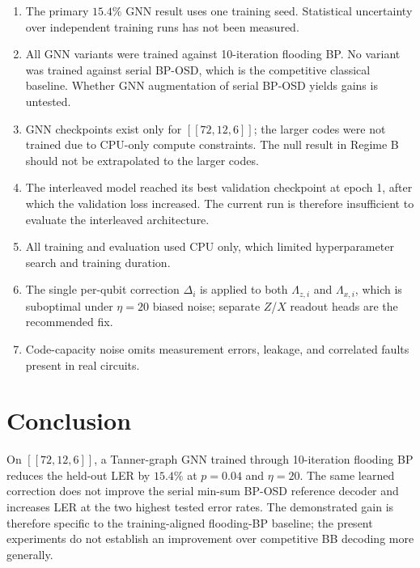 \documentclass[a4paper,twocolumn,11pt,nopdfoutputerror]{quantumarticle}
\newcommand{\llr}{\Lambda}
\newcommand{\code}[3]{\ensuremath{[\![#1,#2,#3]\!]}}
\begin{document}
\begin{enumerate}[leftmargin=*,topsep=3pt,itemsep=2pt,
                  label=(\roman*)]
\item The primary $15.4\%$ GNN result uses one training seed. Statistical
      uncertainty over independent training runs has not been measured.
\item All GNN variants were trained against 10-iteration
      flooding BP. No variant was trained against serial BP-OSD,
      which is the competitive classical baseline. Whether GNN
      augmentation of serial BP-OSD yields gains is untested.
\item GNN checkpoints exist only for $\code{72}{12}{6}$; the
      larger codes were not trained due to CPU-only compute
      constraints. The null result in Regime B should not be
      extrapolated to the larger codes.
\item The interleaved model reached its best validation checkpoint at epoch 1,
      after which the validation loss increased. The current run is therefore
      insufficient to evaluate the interleaved architecture.
\item All training and evaluation used CPU only, which limited
      hyperparameter search and training duration.
\item The single per-qubit correction $\Delta_i$ is applied to
      both $\llr_{z,i}$ and $\llr_{x,i}$, which is suboptimal
      under $\eta = 20$ biased noise; separate $Z$/$X$ readout
      heads are the recommended fix.
\item Code-capacity noise omits measurement errors, leakage,
      and correlated faults present in real circuits.
\end{enumerate}

\section{Conclusion}\label{sec:conclusion}

On $\code{72}{12}{6}$, a Tanner-graph GNN trained through
10-iteration flooding BP reduces the held-out LER by $15.4\%$ at
$p=0.04$ and $\eta=20$. The same learned correction does not improve the
serial min-sum BP-OSD reference decoder and increases LER at the two
highest tested error rates. The demonstrated gain is therefore specific
to the training-aligned flooding-BP baseline; the present experiments do
not establish an improvement over competitive BB decoding more generally.
\end{document}
